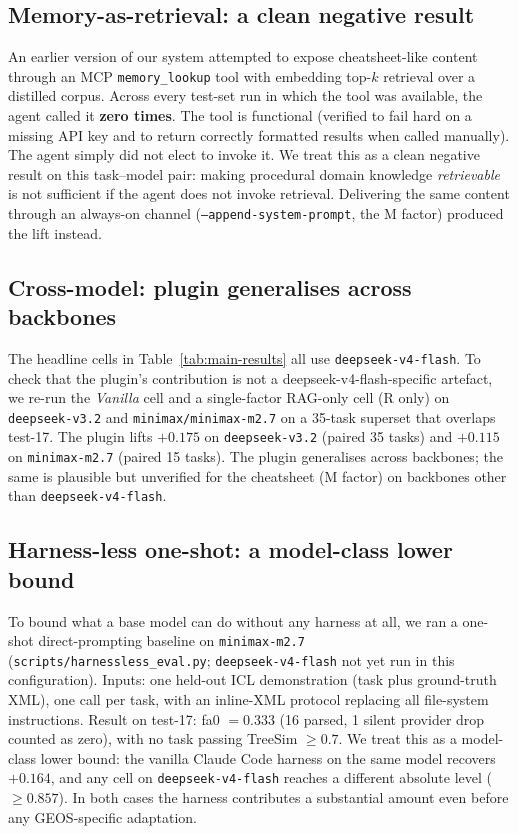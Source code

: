 \documentclass{article}
\begin{document}
\subsection{Memory-as-retrieval: a clean negative result}
\label{subsec:memory-negative}

An earlier version of our system attempted to expose cheatsheet-like content through an MCP \texttt{memory\_lookup} tool with embedding top-$k$ retrieval over a distilled corpus. Across every test-set run in which the tool was available, the agent called it \textbf{zero times}. The tool is functional (verified to fail hard on a missing API key and to return correctly formatted results when called manually). The agent simply did not elect to invoke it. We treat this as a clean negative result on this task--model pair: making procedural domain knowledge \emph{retrievable} is not sufficient if the agent does not invoke retrieval. Delivering the same content through an always-on channel (\texttt{--append-system-prompt}, the M factor) produced the lift instead.

\subsection{Cross-model: plugin generalises across backbones}
\label{subsec:cross-model}

The headline cells in Table~\ref{tab:main-results} all use \texttt{deepseek-v4-flash}. To check that the plugin's contribution is not a deepseek-v4-flash-specific artefact, we re-run the \emph{Vanilla} cell and a single-factor RAG-only cell (R only) on \texttt{deepseek-v3.2} and \texttt{minimax/minimax-m2.7} on a 35-task superset that overlaps test-17. The plugin lifts $+0.175$ on \texttt{deepseek-v3.2} (paired 35 tasks) and $+0.115$ on \texttt{minimax-m2.7} (paired 15 tasks). The plugin generalises across backbones; the same is plausible but unverified for the cheatsheet (M factor) on backbones other than \texttt{deepseek-v4-flash}.

\subsection{Harness-less one-shot: a model-class lower bound}
\label{subsec:harnessless}

To bound what a base model can do without any harness at all, we ran a one-shot direct-prompting baseline on \texttt{minimax-m2.7} (\texttt{scripts/harnessless\_eval.py}; \texttt{deepseek-v4-flash} not yet run in this configuration). Inputs: one held-out ICL demonstration (task plus ground-truth XML), one call per task, with an inline-XML protocol replacing all file-system instructions. Result on test-17: fa0 $= 0.333$ (16 parsed, 1 silent provider drop counted as zero), with no task passing TreeSim $\geq 0.7$. We treat this as a model-class lower bound: the vanilla Claude Code harness on the same model recovers ${+}0.164$, and any cell on \texttt{deepseek-v4-flash} reaches a different absolute level ($\geq 0.857$). In both cases the harness contributes a substantial amount even before any GEOS-specific adaptation.
\end{document}
